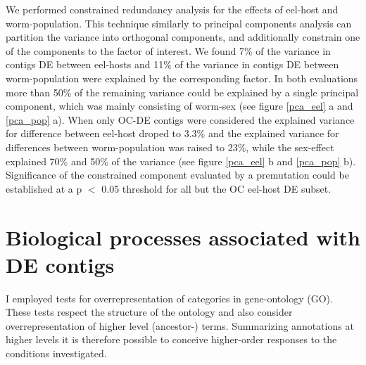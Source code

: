 We performed constrained redundancy analysis for the effects of
eel-host and worm-population. This technique similarly to principal
components analysis can partition the variance into orthogonal
components, and additionally constrain one of the components to the
factor of interest. We found 7\% of the variance in contigs DE between
eel-hosts and 11\% of the variance in contigs DE between
worm-population were explained by the corresponding factor. In both
evaluations more than 50\% of the remaining variance could be
explained by a single principal component, which was mainly consisting
of worm-sex (see figure \ref{pca_eel} a and \ref{pca_pop} a). When
only OC-DE contigs were considered the explained variance for
difference between eel-host droped to 3.3\% and the explained variance
for differences between worm-population was raised to 23\%, while the
sex-effect explained 70\% and 50\% of the variance (see figure
\ref{pca_eel} b and \ref{pca_pop} b). Significance of the constrained
component evaluated by a premutation could be established at a p $<$
0.05 threshold for all but the OC eel-host DE subset.



\afterpage{\clearpage}

\section{Biological processes associated with DE contigs}

I employed tests for overrepresentation of categories in
gene-ontology (GO). These tests respect the structure of the ontology
and also consider overrepresentation of higher level (ancestor-)
terms. Summarizing annotations at higher levels it is therefore
possible to conceive higher-order responses to the conditions
investigated.

